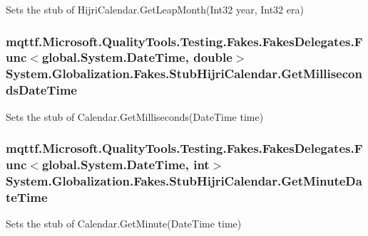 Sets the stub of Hijri\-Calendar.\-Get\-Leap\-Month(\-Int32 year, Int32 era)

\hypertarget{class_system_1_1_globalization_1_1_fakes_1_1_stub_hijri_calendar_a1474772fbd98eeba8c32ea105433a0a9}{
\subsubsection[{Get\-Milliseconds\-Date\-Time}]{\setlength{\rightskip}{0pt plus 5cm}mqttf.\-Microsoft.\-Quality\-Tools.\-Testing.\-Fakes.\-Fakes\-Delegates.\-Func$<$global.\-System.\-Date\-Time, double$>$ System.\-Globalization.\-Fakes.\-Stub\-Hijri\-Calendar.\-Get\-Milliseconds\-Date\-Time}}\label{class_system_1_1_globalization_1_1_fakes_1_1_stub_hijri_calendar_a1474772fbd98eeba8c32ea105433a0a9}


Sets the stub of Calendar.\-Get\-Milliseconds(\-Date\-Time time)

\hypertarget{class_system_1_1_globalization_1_1_fakes_1_1_stub_hijri_calendar_aa972db975161b2bfed249370fd9fb1c9}{
\subsubsection[{Get\-Minute\-Date\-Time}]{\setlength{\rightskip}{0pt plus 5cm}mqttf.\-Microsoft.\-Quality\-Tools.\-Testing.\-Fakes.\-Fakes\-Delegates.\-Func$<$global.\-System.\-Date\-Time, int$>$ System.\-Globalization.\-Fakes.\-Stub\-Hijri\-Calendar.\-Get\-Minute\-Date\-Time}}\label{class_system_1_1_globalization_1_1_fakes_1_1_stub_hijri_calendar_aa972db975161b2bfed249370fd9fb1c9}


Sets the stub of Calendar.\-Get\-Minute(\-Date\-Time time)

